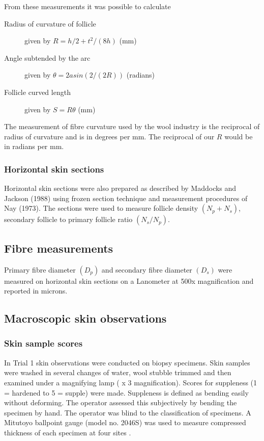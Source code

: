 \documentclass{article}
\begin{document}
From these measurements it was possible to calculate
\begin{description}
\item[Radius of curvature of follicle]  given by $R = h/2 + t^{2}/(8h)$ (mm)
\item[Angle subtended by the arc] given by $\theta = 2 asin(2/(2R))$ (radians)
\item[Follicle curved length] given by $S = R \theta$ (mm)
\end{description}

The measurement of fibre curvature used by the wool industry is the reciprocal of radius of curvature and is in degrees per mm. The reciprocal of our $R$ would be in radians per mm.


\subsubsection{Horizontal skin sections}
Horizontal skin sections were also prepared as described by
Maddocks and Jackson (1988) using frozen section technique and
measurement procedures of Nay (1973). The sections were used to measure
follicle density $(N_{p} + N_{s})$, secondary follicle to primary follicle ratio $(N_{s}/N_{p})$.
 
\subsection{Fibre measurements}
Primary fibre diameter $(D_{p})$ and secondary fibre diameter $(D_{s})$ were measured on horizontal skin sections on a Lanometer at 500x magnification and reported in microns.

\subsection{Macroscopic skin observations}
\subsubsection{Skin sample scores}
In Trial 1 skin observations were conducted on biopsy specimens.
Skin samples were washed in several changes of water, wool stubble trimmed and then examined under a magnifying lamp ( x 3 magnification).  Scores for  suppleness (1 = hardened to 5 = supple) were made. Suppleness is defined as bending easily without deforming. The operator assessed this subjectively by bending the specimen by hand. The operator was blind to the classification of specimens.  A Mitutoyo ballpoint gauge (model no. 2046S) was used to measure compressed thickness of each specimen at four sites .  
\end{document}
